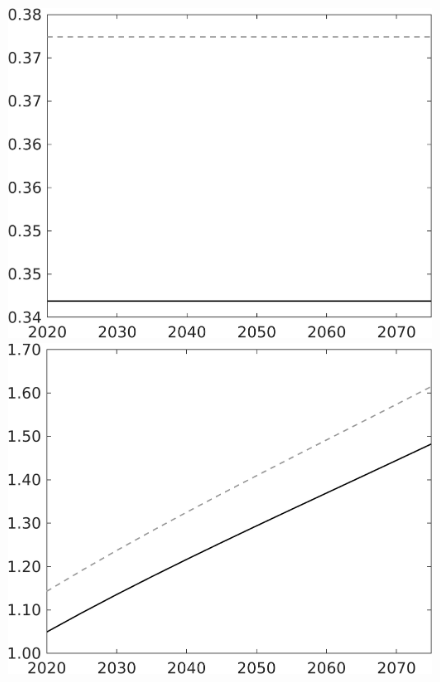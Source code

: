 \begin{figure}[h!!]
\begin{minipage}[]{0.32\textwidth}
	\end{minipage}	
	\begin{minipage}[]{0.32\textwidth}
		\includegraphics[width=1\textwidth]{../../codding_model/own_basedOnFried/optimalPol_010922_revision/figures/all_13Sept22/CompTaul_Equlab_LFBAU_Reg0_hh_spillover0_nsk1_xgr1_knspil1_sep1_countec0_GovRev0_etaa0.79_lgd0.png}
	\end{minipage}	
	\begin{minipage}[]{0.32\textwidth}
		\includegraphics[width=1\textwidth]{../../codding_model/own_basedOnFried/optimalPol_010922_revision/figures/all_13Sept22/CompTaul_Equlab_LFBAU_Reg0_C_spillover0_nsk1_xgr1_knspil1_sep1_countec0_GovRev0_etaa0.79_lgd0.png}

\end{minipage}
\end{figure}
